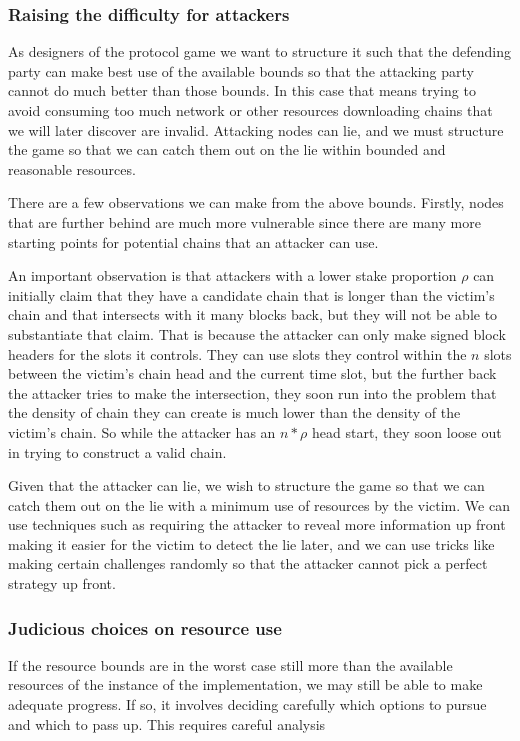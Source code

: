 \documentclass{article}
\theoremstyle{definition}{
  \newtheorem{lemma}{Lemma}[section] %
  \newtheorem{definition}[lemma]{Definition}
}
\theoremstyle{theorem}{
  \newtheorem{invariant}[lemma]{Invariant}
  \newtheorem{proofobligation}[lemma]{Proof Obligation}
}
\numberwithin{equation}{lemma}
\begin{document}
\subsubsection{Raising the difficulty for attackers}

As designers of the protocol game we want to structure it such that the
defending party can make best use of the available bounds so that the attacking
party cannot do much better than those bounds. In this case that means trying
to avoid consuming too much network or other resources downloading chains that
we will later discover are invalid. Attacking nodes can lie, and we must
structure the game so that we can catch them out on the lie within bounded and
reasonable resources.

There are a few observations we can make from the above bounds. Firstly,
nodes that are further behind are much more vulnerable since there are many
more starting points for potential chains that an attacker can use.

An important observation is that attackers with a lower stake proportion $\rho$
can initially claim that they have a candidate chain that is longer than the
victim's chain and that intersects with it many blocks back, but they will not
be able to substantiate that claim. That is because the attacker can only make
signed block headers for the slots it controls. They can use slots they control
within the $n$ slots between the victim's chain head and the current time slot,
but the further back the attacker tries to make the intersection, they soon
run into the problem that the density of chain they can create is much lower
than the density of the victim's chain. So while the attacker has an $n * \rho$
head start, they soon loose out in trying to construct a valid chain.

Given that the attacker can lie, we wish to structure the game so that we can
catch them out on the lie with a minimum use of resources by the victim. We can
use techniques such as requiring the attacker to reveal more information up
front making it easier for the victim to detect the lie later, and we can use
tricks like making certain challenges randomly so that the attacker cannot pick
a perfect strategy up front.

\subsubsection{Judicious choices on resource use}

If the resource bounds are in the worst case still more than the available
resources of the instance of the implementation, we may still be able to
make adequate progress. If so, it involves deciding carefully which options
to pursue and which to pass up. This requires careful analysis 
\end{document}
